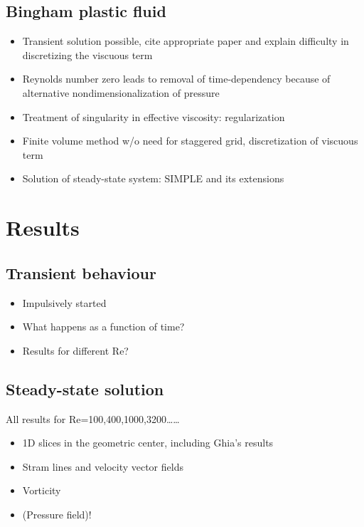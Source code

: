\documentclass[final,3p,twocolumn]{elsarticle}
\begin{document}
\subsection{Bingham plastic fluid}
\label{subsec:bingham}

\begin{itemize}
    \item Transient solution possible, cite appropriate paper and explain
        difficulty in discretizing the viscuous term
    \item Reynolds number zero leads to removal of time-dependency because of
        alternative nondimensionalization of pressure 
    \item Treatment of singularity in effective viscosity: regularization
    \item Finite volume method w/o need for staggered grid, discretization of
        viscuous term
    \item Solution of steady-state system: SIMPLE and its extensions
\end{itemize}

\section{Results}
\label{sec:results}

\subsection{Transient behaviour}
\label{subsec:transient}

\begin{itemize}
    \item Impulsively started
    \item What happens as a function of time? 
    \item Results for different Re? 
\end{itemize}

\subsection{Steady-state solution}
\label{subsec:steady}

All results for Re=100,400,1000,3200\ldots\ldots

\begin{itemize}
    \item 1D slices in the geometric center, including Ghia's results
    \item Stram lines and velocity vector fields
    \item Vorticity 
    \item (Pressure field)!
\end{itemize}
\end{document}

